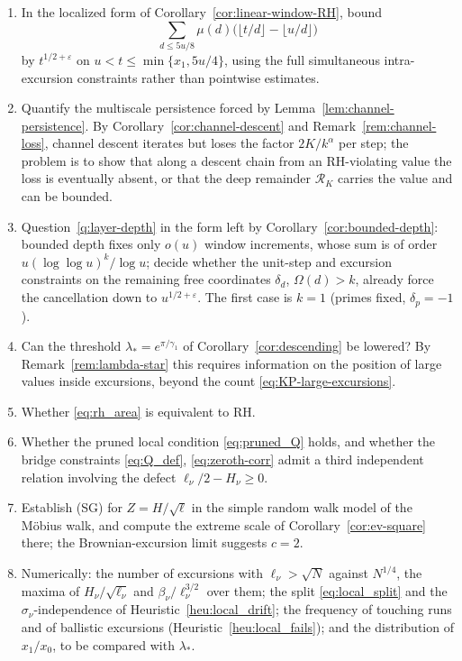 \documentclass[11pt]{amsart}
\numberwithin{equation}{section}
\theoremstyle{plain}
\theoremstyle{definition}
\theoremstyle{remark}
\newcommand{\eps}{\varepsilon}
\begin{document}
\begin{enumerate}[label=\textup{(\arabic*)}]
\item In the localized form of Corollary~\ref{cor:linear-window-RH}, bound
\[
\sum_{d\le5u/8}\mu(d)
\bigl(\lfloor t/d\rfloor-\lfloor u/d\rfloor\bigr)
\]
by $t^{1/2+\eps}$ on
$u<t\le\min\{x_1,5u/4\}$, using the full simultaneous intra-excursion
constraints rather than pointwise estimates.
\item Quantify the multiscale persistence forced by
Lemma~\ref{lem:channel-persistence}.  By Corollary~\ref{cor:channel-descent}
and Remark~\ref{rem:channel-loss}, channel descent iterates but loses the
factor $2K/k^\alpha$ per step; the problem is to show that along a descent
chain from an RH-violating value the loss is eventually absent, or that the
deep remainder $\mathcal R_K$ carries the value and can be bounded.
\item Question~\ref{q:layer-depth} in the form left by
Corollary~\ref{cor:bounded-depth}: bounded depth fixes only $o(u)$ window
increments, whose sum is of order $u(\log\log u)^k/\log u$; decide whether
the unit-step and excursion constraints on the remaining free coordinates
$\delta_d$, $\Omega(d)>k$, already force the cancellation down to
$u^{1/2+\eps}$. The first case is $k=1$ (primes fixed, $\delta_p=-1$).
\item Can the threshold $\lambda_*=e^{\pi/\gamma_1}$ of
Corollary~\ref{cor:descending} be lowered? By
Remark~\ref{rem:lambda-star} this requires information on the position of
large values inside excursions, beyond the count
\eqref{eq:KP-large-excursions}.
\item Whether \eqref{eq:rh_area} is equivalent to RH.
\item Whether the pruned local condition \eqref{eq:pruned_Q} holds, and
whether the bridge constraints \eqref{eq:Q_def}, \eqref{eq:zeroth-corr}
admit a third independent relation involving the defect
$\ell_\nu/2-H_\nu\ge0$.
\item Establish (SG) for $Z=H/\sqrt\ell$ in the simple random walk model of
the M\"obius walk, and compute the extreme scale of
Corollary~\ref{cor:ev-square} there; the Brownian-excursion limit suggests
$c=2$.
\item Numerically: the number of excursions with $\ell_\nu>\sqrt N$ against
$N^{1/4}$, the maxima of $H_\nu/\sqrt{\ell_\nu}$ and $\beta_\nu/\ell_\nu^{3/2}$
over them; the split \eqref{eq:local_split} and the $\sigma_\nu$-independence
of Heuristic~\ref{heu:local_drift}; the frequency of touching runs and of
ballistic excursions (Heuristic~\ref{heu:local_fails}); and the distribution
of $x_1/x_0$, to be compared with $\lambda_*$.
\end{enumerate}
\end{document}
